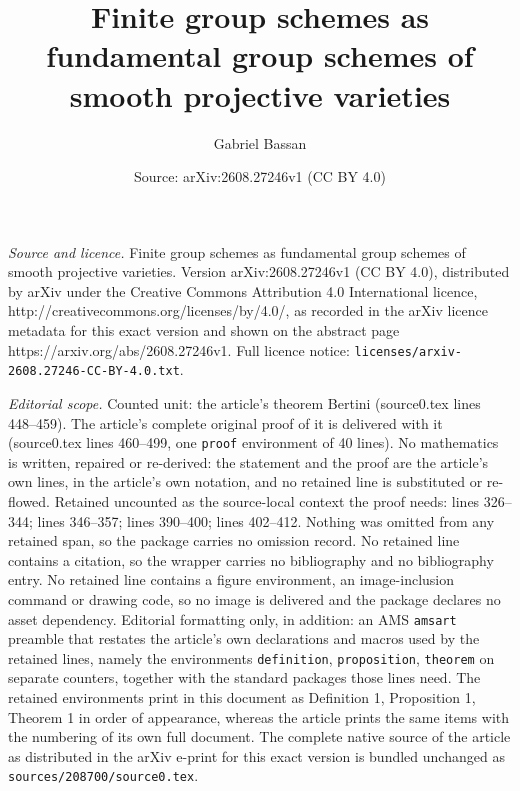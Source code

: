 \documentclass[10pt,a4paper]{amsart}
\title{Finite group schemes as fundamental group schemes of smooth projective varieties}
\author{Gabriel Bassan}
\date{Source: arXiv:2608.27246v1 (CC BY 4.0)}
\begin{document}
\maketitle

\noindent\emph{Source and licence.} Finite group schemes as fundamental group schemes of smooth projective varieties. Version arXiv:2608.27246v1 (CC BY 4.0), distributed by arXiv under the Creative Commons Attribution 4.0 International licence, http://creativecommons.org/licenses/by/4.0/, as recorded in the arXiv licence metadata for this exact version and shown on the abstract page https://arxiv.org/abs/2608.27246v1. Full licence notice: \texttt{licenses/arxiv-2608.27246-CC-BY-4.0.txt}.\par\smallskip

\noindent\textit{Editorial scope.} Counted unit: the article's theorem Bertini (source0.tex lines 448--459). The article's complete original proof of it is delivered with it (source0.tex lines 460--499, one \texttt{proof} environment of 40 lines). No mathematics is written, repaired or re-derived: the statement and the proof are the article's own lines, in the article's own notation, and no retained line is substituted or re-flowed.  Retained uncounted as the source-local context the proof needs: lines 326--344; lines 346--357; lines 390--400; lines 402--412.  Nothing was omitted from any retained span, so the package carries no omission record.  No retained line contains a citation, so the wrapper carries no bibliography and no bibliography entry.  No retained line contains a figure environment, an image-inclusion command or drawing code, so no image is delivered and the package declares no asset dependency.  Editorial formatting only, in addition: an AMS \texttt{amsart} preamble that restates the article's own declarations and macros used by the retained lines, namely the environments \texttt{definition}, \texttt{proposition}, \texttt{theorem} on separate counters, together with the standard packages those lines need.  The retained environments print in this document as Definition 1, Proposition 1, Theorem 1 in order of appearance, whereas the article prints the same items with the numbering of its own full document.  The complete native source of the article as distributed in the arXiv e-print for this exact version is bundled unchanged as \texttt{sources/208700/source0.tex}.
\end{document}
